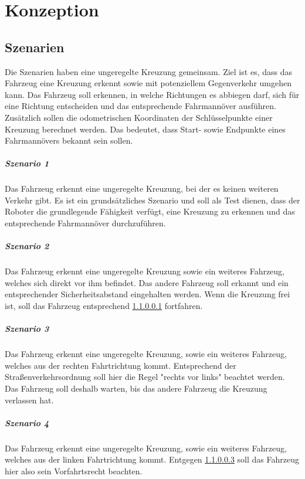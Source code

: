 \chapter{Konzeption}
\section{Szenarien}
Die Szenarien haben eine ungeregelte Kreuzung gemeinsam. Ziel ist es, dass das Fahrzeug eine Kreuzung erkennt sowie mit potenziellem Gegenverkehr umgehen kann. Das Fahrzeug soll 
erkennen, in welche Richtungen es abbiegen darf, sich für eine Richtung entscheiden und das entsprechende Fahrmannöver ausführen. Zusätzlich sollen die odometrischen Koordinaten
der Schlüsselpunkte einer Kreuzung berechnet werden. Das bedeutet, dass Start- sowie Endpunkte eines Fahrmannövers bekannt sein sollen. 
\paragraph{Szenario 1}
\label{Szenario 1}
Das Fahrzeug erkennt eine ungeregelte Kreuzung, bei der es keinen weiteren Verkehr gibt. Es ist ein grundsätzliches Szenario und soll als Test dienen, dass der Roboter die grundlegende
Fähigkeit verfügt, eine Kreuzung zu erkennen und das entsprechende Fahrmannöver durchzuführen.

\paragraph{Szenario 2}
\label{Szenario 2}
Das Fahrzeug erkennt eine ungeregelte Kreuzung sowie ein weiteres Fahrzeug, welches sich direkt vor ihm befindet. Das andere Fahrzeug soll erkannt und ein entsprechender Sicherheitsabstand 
eingehalten werden. Wenn die Kreuzung frei ist, soll das Fahrzeug entsprechend \ref{Szenario 1} fortfahren.

\paragraph{Szenario 3}
\label{Szenario 3}
Das Fahrzeug erkennt eine ungeregelte Kreuzung, sowie ein weiteres Fahrzeug, welches aus der rechten Fahrtrichtung kommt. Entsprechend der Straßenverkehrsordnung soll hier die 
Regel "rechts vor links" beachtet werden. Das Fahrzeug soll deshalb warten, bis das andere Fahrzeug die Kreuzung verlassen hat.

\paragraph{Szenario 4}
\label{Szenario 4}
Das Fahrzeug erkennt eine ungeregelte Kreuzung, sowie ein weiteres Fahrzeug, welches aus der linken Fahrtrichtung kommt. Entgegen \ref{Szenario 3} soll das 
Fahrzeug hier also sein Vorfahrtsrecht beachten.

